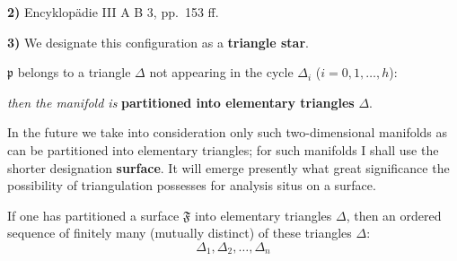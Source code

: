 \documentclass{article}
\begin{document}
\textbf{2)} Encyklopädie III A B 3, pp.~153 ff.

\textbf{3)} We designate this configuration as a \textbf{triangle star}.

$\mathfrak{p}$ belongs to a triangle $\Delta$ not appearing in the cycle $\Delta_i$ ($i = 0, 1, \dots, h$):

\emph{then the manifold is} \textbf{partitioned into elementary triangles} $\Delta$.

In the future we take into consideration only such two-dimensional manifolds as can be partitioned into elementary triangles; for such manifolds I shall use the shorter designation \textbf{surface}. It will emerge presently what great significance the possibility of triangulation possesses for analysis situs on a surface.

If one has partitioned a surface $\mathfrak{F}$ into elementary triangles $\Delta$, then an ordered sequence of finitely many (mutually distinct) of these triangles $\Delta$:
\[
\Delta_1, \Delta_2, \dots, \Delta_n
\]
\end{document}
